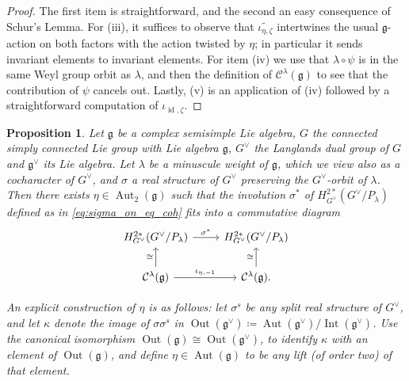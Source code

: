\documentclass{amsart}
\newcommand{\Aut}{\operatorname{Aut}}
\newcommand{\Kir}{\mathcal{C}}
\newcommand{\g}{\mathfrak{g}}
\newcommand{\id}{\operatorname{id}}
\newcommand{\Int}{\operatorname{Int}}
\newcommand{\Out}{\operatorname{Out}}
\theoremstyle{definition}
\theoremstyle{plain}
\newtheorem{prop}[defn]{Proposition}
\theoremstyle{remark}
\begin{document}
\begin{proof}
    The first item is straightforward, and the second an easy consequence of Schur's Lemma. For (iii), it suffices to observe that $\widetilde{\iota_{\eta,\zeta}}$ intertwines the usual $\g$-action on both factors with the action twisted by $\eta$; in particular it sends invariant elements to invariant elements. For item (iv) we use that $\lambda \circ \psi$ is in the same Weyl group orbit as $\lambda$, and then the definition of $\Kir^\lambda(\g)$ to see that the contribution of $\psi$ cancels out. Lastly, (v) is an application of (iv) followed by a straightforward computation of $\iota_{\id, \zeta}$. 
\end{proof}

\begin{prop}
\label{prop:sigma_action_translated}
    Let $\g$ be a complex semisimple Lie algebra, $G$ the connected simply connected Lie group with Lie algebra $\g$, $G^\vee$ the Langlands dual group of $G$ and $\g^\vee$ its Lie algebra. Let $\lambda$ be a minuscule weight of $\g$, which we view also as a cocharacter of $G^\vee$, and $\sigma$ a real structure of $G^\vee$ preserving the $G^\vee$-orbit of $\lambda$. Then there exists $\eta\in \Aut_2(\g)$ such that the involution $\sigma^*$ of $H^{2*}_{G^\vee}(G^\vee/P_\lambda)$ defined as in \eqref{eq:sigma_on_eq_coh} fits into a commutative diagram
    $$
    \begin{tikzcd}
        H^{2*}_{G^\vee}(G^\vee/P_\lambda)
            \arrow[r, "\sigma^*"]
        & H^{2*}_{G^\vee}(G^\vee/P_\lambda)
        \\
        \Kir^\lambda(\g)
            \arrow[r, "\iota_{\eta, -1}"]
            \arrow[u, "\cong"]
        &
        \Kir^\lambda(\g).
            \arrow[u, "\cong"]
    \end{tikzcd}
    $$

    An explicit construction of $\eta$ is as follows: let $\sigma^{s}$ be any split real structure of $G^\vee$, and let $\kappa$ denote the image of $\sigma\sigma^s$ in $\Out(\g^\vee)\coloneqq \Aut(\g^\vee)/\Int(\g^\vee)$. Use the canonical isomorphism $\Out(\g)\cong \Out(\g^\vee)$, to identify $\kappa$ with an element of $\Out(\g)$, and define $\eta\in \Aut(\g)$ to be any lift (of order two) of that element. 
\end{prop}
\end{document}
